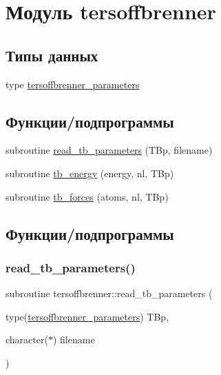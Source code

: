 \hypertarget{namespacetersoffbrenner}{}\section{Модуль tersoffbrenner}
\label{namespacetersoffbrenner}
\subsection*{Типы данных}
\begin{DoxyCompactItemize}
\item 
type \mbox{\hyperlink{structtersoffbrenner_1_1tersoffbrenner__parameters}{tersoffbrenner\+\_\+parameters}}
\end{DoxyCompactItemize}
\subsection*{Функции/подпрограммы}
\begin{DoxyCompactItemize}
\item 
subroutine \mbox{\hyperlink{namespacetersoffbrenner_a04beb5c27e136d95b3502f15d39d8ef9}{read\+\_\+tb\+\_\+parameters}} (T\+Bp, filename)
\item 
subroutine \mbox{\hyperlink{namespacetersoffbrenner_a273a6849892363697886b1f1d0f8df93}{tb\+\_\+energy}} (energy, nl, T\+Bp)
\item 
subroutine \mbox{\hyperlink{namespacetersoffbrenner_a1edc8ac251b3fa58026839db4d23f12a}{tb\+\_\+forces}} (atoms, nl, T\+Bp)
\end{DoxyCompactItemize}


\subsection{Функции/подпрограммы}
\mbox{\label{namespacetersoffbrenner_a04beb5c27e136d95b3502f15d39d8ef9}} 
\subsubsection{\texorpdfstring{read\+\_\+tb\+\_\+parameters()}{read\_tb\_parameters()}}
{\footnotesize\ttfamily subroutine tersoffbrenner\+::read\+\_\+tb\+\_\+parameters (\begin{DoxyParamCaption}\item[{type(\mbox{\hyperlink{structtersoffbrenner_1_1tersoffbrenner__parameters}{tersoffbrenner\+\_\+parameters}})}]{T\+Bp,  }\item[{character($\ast$)}]{filename }\end{DoxyParamCaption})}



